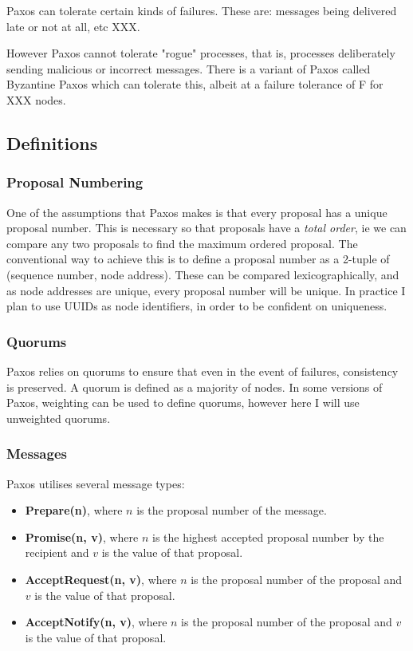 \documentclass[12pt,twoside,notitlepage]{report}
\begin{document}
Paxos can tolerate certain kinds of failures. These are: messages being delivered late or not at
all, etc XXX.

However Paxos cannot tolerate "rogue" processes, that is, processes deliberately sending malicious
or incorrect messages. There is a variant of Paxos called Byzantine Paxos which can tolerate this,
albeit at a failure tolerance of F for XXX nodes.


\subsection{Definitions}

\subsubsection*{Proposal Numbering}

One of the assumptions that Paxos makes is that every proposal has a unique proposal number. This
is necessary so that proposals have a \emph{total order}, ie we can compare any two proposals to
find the maximum ordered proposal. The conventional way to achieve this is to define a proposal
number as a 2-tuple of (sequence number, node address). These can be compared lexicographically,
and as node addresses are unique, every proposal number will be unique. In practice I plan to use
UUIDs as node identifiers, in order to be confident on uniqueness.

\subsubsection*{Quorums}

Paxos relies on quorums to ensure that even in the event of failures, consistency is preserved. A
quorum is defined as a majority of nodes. In some versions of Paxos, weighting can be used to
define quorums, however here I will use unweighted quorums.

\subsubsection*{Messages}

Paxos utilises several message types:

\begin{itemize}
\item {\bf Prepare(n)}, where $n$ is the proposal number of the message.
\item {\bf Promise(n, v)}, where $n$ is the highest accepted proposal number by the recipient and
	$v$ is the value of that proposal.
\item {\bf AcceptRequest(n, v)}, where $n$ is the proposal number of the proposal and $v$ is the
	value of that proposal.
\item {\bf AcceptNotify(n, v)}, where $n$ is the proposal number of the proposal and $v$ is the value
	of that proposal.
\end{itemize}
\end{document}

